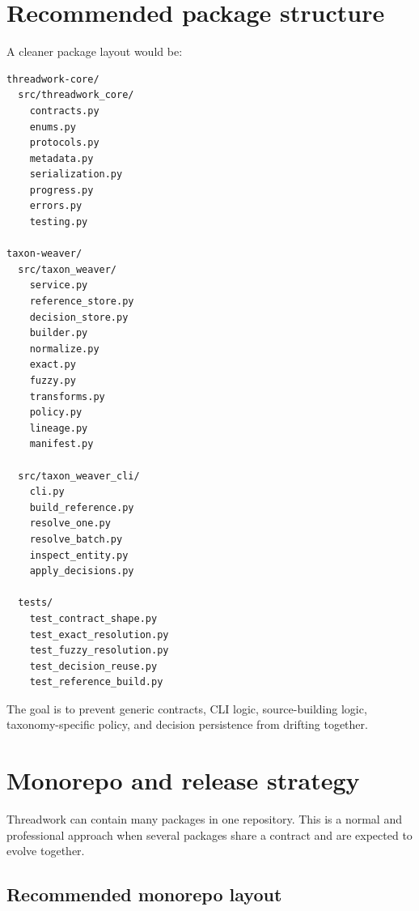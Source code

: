 \documentclass[11pt,a4paper]{article}
\begin{document}
\section{Recommended package structure}

A cleaner package layout would be:

\begin{Verbatim}[fontsize=\small]
threadwork-core/
  src/threadwork_core/
    contracts.py
    enums.py
    protocols.py
    metadata.py
    serialization.py
    progress.py
    errors.py
    testing.py

taxon-weaver/
  src/taxon_weaver/
    service.py
    reference_store.py
    decision_store.py
    builder.py
    normalize.py
    exact.py
    fuzzy.py
    transforms.py
    policy.py
    lineage.py
    manifest.py

  src/taxon_weaver_cli/
    cli.py
    build_reference.py
    resolve_one.py
    resolve_batch.py
    inspect_entity.py
    apply_decisions.py

  tests/
    test_contract_shape.py
    test_exact_resolution.py
    test_fuzzy_resolution.py
    test_decision_reuse.py
    test_reference_build.py
\end{Verbatim}

The goal is to prevent generic contracts, CLI logic, source-building logic, taxonomy-specific policy, and decision persistence from drifting together.

\section{Monorepo and release strategy}

Threadwork can contain many packages in one repository. This is a normal and professional approach when several packages share a contract and are expected to evolve together.

\subsection{Recommended monorepo layout}
\end{document}

